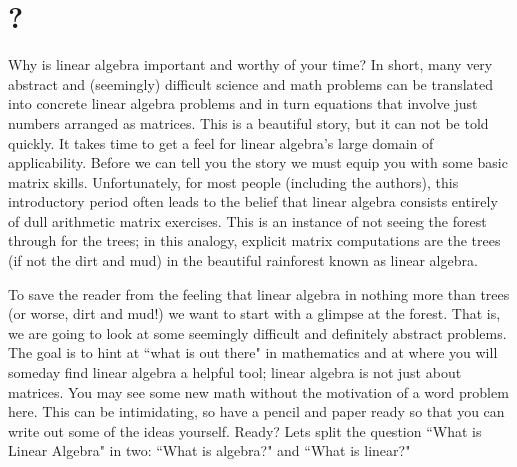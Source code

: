 \chapter{\whatIsTitle?}\label{warmup}



Why is linear algebra important and worthy of your time? 
In short, many very abstract and (seemingly) difficult science and math problems %
can be translated into concrete linear algebra problems and in turn equations that involve just numbers arranged as matrices. 
This is a beautiful story, but it can not be told quickly. 
It takes time to get a feel for linear algebra's large domain of applicability. 
Before we can tell you the story we must equip you with some basic matrix skills.  
Unfortunately, for most people (including the authors), 
this introductory period often leads to the 
belief that linear algebra consists 
entirely of dull arithmetic matrix exercises. 
This is an instance of not seeing the forest through for the trees; 
in this analogy, explicit matrix computations are the trees (if not the dirt and mud) in the beautiful rainforest known as linear algebra. 

To  save the reader from the feeling that linear algebra in nothing more than trees 
(or worse, dirt and mud!)  
we want to start with a glimpse at the forest. 
That is, we are going to look at some  seemingly difficult and definitely abstract problems. 
The goal is to hint at ``what is out there" in mathematics and at where you will someday find linear algebra a helpful tool; linear algebra is not just about matrices. 
You may see some new math without the motivation of a word problem here.
This can be intimidating, so have a pencil and paper ready so that you can write out some of the ideas yourself. Ready? Lets split the question ``What is Linear Algebra" in two: ``What is algebra?" and  ``What is linear?"\\  





\newpage
\noindent 

